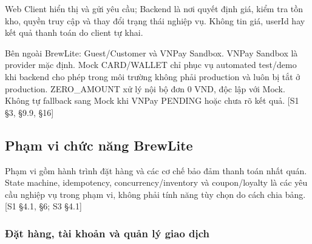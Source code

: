 Web Client hiển thị và gửi yêu cầu; Backend là nơi quyết định giá, kiểm tra tồn kho, quyền truy cập và thay đổi trạng thái nghiệp vụ. Không tin giá, userId hay kết quả thanh toán do client tự khai.
\par

Bên ngoài BrewLite: Guest/Customer và VNPay Sandbox. VNPay Sandbox là provider mặc định. Mock CARD/WALLET chỉ phục vụ automated test/demo khi backend cho phép trong môi trường không phải production và luôn bị tắt ở production. ZERO\_AMOUNT xử lý nội bộ đơn 0 VND, độc lập với Mock. Không tự fallback sang Mock khi VNPay PENDING hoặc chưa rõ kết quả. [S1 §3, §9.9, §16]
\par

\subsection{Phạm vi chức năng BrewLite}

Phạm vi gồm hành trình đặt hàng và các cơ chế bảo đảm thanh toán nhất quán. State machine, idempotency, concurrency/inventory và coupon/loyalty là các yêu cầu nghiệp vụ trong phạm vi, không phải tính năng tùy chọn do cách chia bảng. [S1 §4.1, §6; S3 §4.1]
\par

\subsubsection{Đặt hàng, tài khoản và quản lý giao dịch}

